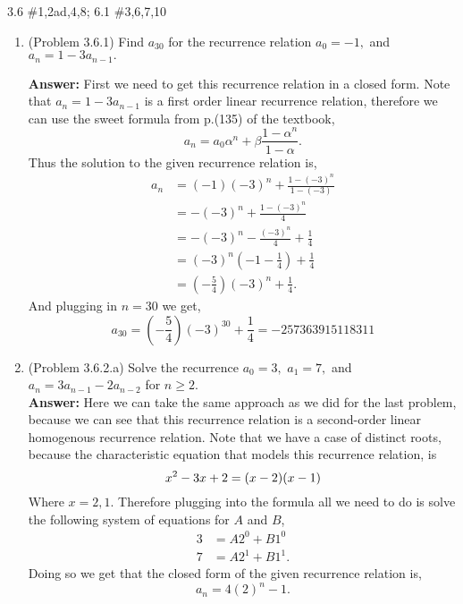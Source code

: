 \documentclass{amsart}
\begin{document}
\thispagestyle{fancy}

3.6 \#1,2ad,4,8;                   6.1 \#3,6,7,10
 
\begin{enumerate}
\item (Problem 3.6.1) Find $a_{30}$ for the recurrence relation $a_0=-1,$ and $a_n=1-3a_{n-1}.$

\textbf{Answer:} First we need to get this recurrence relation in a closed form. Note that $a_n=1-3a_{n-1}$ is a first order linear recurrence relation, therefore we can use the sweet formula from p.(135) of the textbook,
\begin{equation*}
a_n = a_0\alpha^n+\beta\frac{1-\alpha^n}{1-\alpha}.
\end{equation*}
Thus the solution to the given recurrence relation is,
\begin{align*}
a_n &= (-1)(-3)^n+\frac{1-(-3)^n}{1-(-3)}\\
&= -(-3)^n+\frac{1-(-3)^n}{4}\\
&= -(-3)^n-\frac{(-3)^n}{4}+\frac{1}{4}\\
&= (-3)^n(-1-\frac{1}{4})+\frac{1}{4}\\
&= (-\frac{5}{4})(-3)^n+\frac{1}{4}.
\end{align*}
And plugging in $n=30$ we get,
\begin{equation*}
a_{30} =  (-\frac{5}{4})(-3)^{30}+\frac{1}{4} = -257363915118311
\end{equation*}
\vspace{1in}

\item (Problem 3.6.2.a) Solve the recurrence $a_0=3,$ $a_1=7,$ and $a_n=3a_{n-1}-2a_{n-2}$ for $n\geq 2.$\\
\textbf{Answer:} Here we can take the same approach as we did for the last problem, because we can see that this recurrence relation is a second-order linear homogenous recurrence relation. Note that we have a case of distinct roots, because the characteristic equation that models this recurrence relation, is \begin{equation*}
x^2-3x+2 = (x-2)(x-1)\\
\end{equation*}
Where $x = 2,1$. Therefore plugging into the formula all we need to do is solve the following system of equations for $A$ and $B$,
\begin{align*}
3 &= A2^{0}+B1^{0}\\
7 &= A2^{1}+B1^{1}.
\end{align*}
Doing so we get that the closed form of the given recurrence relation is,
\begin{equation*}
a_n = 4(2)^{n}-1.
\end{equation*}
\vspace{1in}


\end{enumerate}
\end{document}
